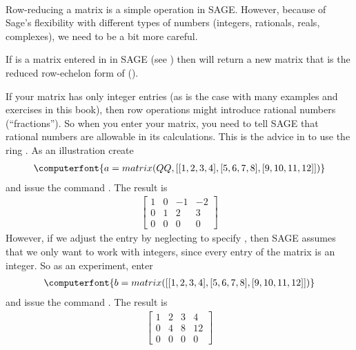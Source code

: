 \\
Row-reducing a matrix is a simple operation in SAGE.  However, because of Sage's flexibility with different types of numbers (integers, rationals, reals, complexes), we need to be a bit more careful.\par
%
If  is a matrix entered in in SAGE (see ) then  will return a new matrix that is the reduced row-echelon form of  ().\par
%
If your matrix has only integer entries (as is the case with many examples and exercises in this book), then row operations might introduce rational numbers (``fractions'').  So when you enter your matrix, you need to tell SAGE that rational numbers are allowable in its calculations.  This is the advice in  to use the ring .  As an illustration create
%
\begin{align*}
\computerfont{a = matrix(QQ, [[1,2,3,4], [5,6,7,8],[9,10,11,12]] )}
\end{align*}
%
and issue the command .  The result is
%
\begin{align*}
\begin{bmatrix}
1 & 0 & -1 & -2 \\
0 & 1 & 2 & 3 \\
0 & 0 & 0 & 0
\end{bmatrix}
\end{align*}
%
However, if we adjust the entry by neglecting to specify , then SAGE assumes that we only want to work with integers, since every entry of the matrix is an integer.  So as an experiment, enter
%
\begin{align*}
\computerfont{b = matrix([[1,2,3,4], [5,6,7,8],[9,10,11,12]] )}
\end{align*}
%
and issue the command .  The result is
%
\begin{align*}
\begin{bmatrix}
1 & 2 & 3 & 4 \\
0 & 4 & 8 & 12 \\
0 & 0 & 0 & 0
\end{bmatrix}
\end{align*}
